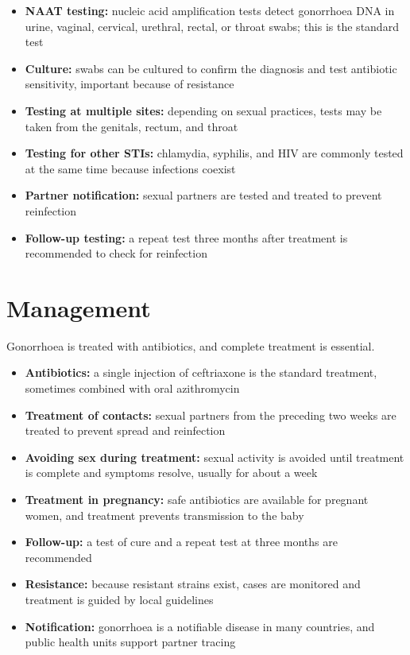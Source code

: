 \begin{itemize}
    \item \textbf{NAAT testing:} nucleic acid amplification tests detect gonorrhoea DNA in urine, vaginal, cervical, urethral, rectal, or throat swabs; this is the standard test
    \item \textbf{Culture:} swabs can be cultured to confirm the diagnosis and test antibiotic sensitivity, important because of resistance
    \item \textbf{Testing at multiple sites:} depending on sexual practices, tests may be taken from the genitals, rectum, and throat
    \item \textbf{Testing for other STIs:} chlamydia, syphilis, and HIV are commonly tested at the same time because infections coexist
    \item \textbf{Partner notification:} sexual partners are tested and treated to prevent reinfection
    \item \textbf{Follow-up testing:} a repeat test three months after treatment is recommended to check for reinfection
\end{itemize}

\section*{Management}
Gonorrhoea is treated with antibiotics, and complete treatment is essential.

\begin{itemize}
    \item \textbf{Antibiotics:} a single injection of ceftriaxone is the standard treatment, sometimes combined with oral azithromycin
    \item \textbf{Treatment of contacts:} sexual partners from the preceding two weeks are treated to prevent spread and reinfection
    \item \textbf{Avoiding sex during treatment:} sexual activity is avoided until treatment is complete and symptoms resolve, usually for about a week
    \item \textbf{Treatment in pregnancy:} safe antibiotics are available for pregnant women, and treatment prevents transmission to the baby
    \item \textbf{Follow-up:} a test of cure and a repeat test at three months are recommended
    \item \textbf{Resistance:} because resistant strains exist, cases are monitored and treatment is guided by local guidelines
    \item \textbf{Notification:} gonorrhoea is a notifiable disease in many countries, and public health units support partner tracing
\end{itemize}

